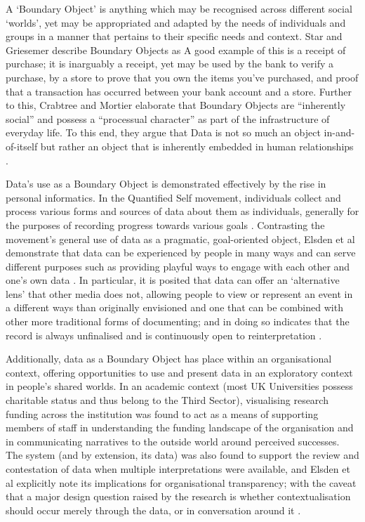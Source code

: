 A `Boundary Object' is anything which may be recognised across different social `worlds', yet may be appropriated and adapted by the needs of individuals and groups in a manner that pertains to their specific needs and context. Star and Griesemer describe Boundary Objects as  \cite{star_institutional_1989} A good example of this is a receipt of purchase; it is inarguably a receipt, yet may be used by the bank to verify a purchase, by a store to prove that you own the items you've purchased, and proof that a transaction has occurred between your bank account and a store. Further to this, Crabtree and Mortier elaborate that Boundary Objects are ``inherently social'' and possess a ``processual character'' as part of the infrastructure of everyday life. To this end, they argue that Data is not so much an object in-and-of-itself but rather an object that is inherently embedded in human relationships \cite{crabtree_human_2015}.

Data's use as a Boundary Object is demonstrated effectively by the rise in personal informatics. In the Quantified Self movement, individuals collect and process various forms and sources of data about them as individuals, generally for the purposes of recording progress towards various goals \cite{swan_emerging_2009, swan_quantified_2013}. Contrasting the movement's general use of data as a pragmatic, goal-oriented object, Elsden et al demonstrate that data can be experienced by people in many ways and can serve different purposes such as providing playful ways to engage with each other and one's own data \cite{elsden_quantified_2014, elsden_metadating:_2016}. In particular, it is posited that data can offer an `alternative lens' that other media does not, allowing people to view or represent an event in a different ways than originally envisioned and one that can be combined with other more traditional forms of documenting; and in doing so indicates that the record is always unfinalised and is continuously open to reinterpretation \cite{elsden_designing_2017}.

Additionally, data as a Boundary Object has place within an organisational context, offering opportunities to use and present data in an exploratory context in people's shared worlds. In an academic context (most UK Universities possess charitable status and thus belong to the Third Sector), visualising research funding across the institution was found to act as a means of supporting members of staff in understanding the funding landscape of the organisation and in communicating narratives to the outside world around perceived successes. The system (and by extension, its data) was also found to support the review and contestation of data when multiple interpretations were available, and Elsden et al explicitly note its implications for organisational transparency; with the caveat that a major design question raised by the research is whether contextualisation should occur merely through the data, or in conversation around it \cite{elsden_resviz:_2016}.

